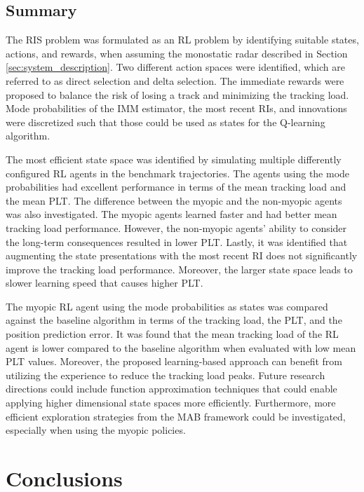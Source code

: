 \documentclass[english, 12pt, a4paper, elec, utf8, a-1b, online]{aaltothesis}
\numberwithin{equation}{section}
\begin{document}
\subsection{Summary}

The RIS problem was formulated as an RL problem by identifying suitable states, actions, and rewards, when assuming the monostatic radar described in Section \ref{sec:system_description}.
Two different action spaces were identified, which are referred to as direct selection and delta selection.
The immediate rewards were proposed to balance the risk of losing a track and minimizing the tracking load.
Mode probabilities of the IMM estimator, the most recent RIs, and innovations were discretized such that those could be used as states for the Q-learning algorithm.

The most efficient state space was identified by simulating multiple differently configured  RL agents in the benchmark trajectories.
The agents using the mode probabilities had excellent performance in terms of the mean tracking load and the mean PLT.
The difference between the myopic and the non-myopic agents was also investigated.
The myopic agents learned faster and had better mean tracking load performance.
However, the non-myopic agents' ability to consider the long-term consequences resulted in lower PLT. 
Lastly, it was identified that augmenting the state presentations with the most recent RI does not significantly improve the tracking load performance.
Moreover, the larger state space leads to slower learning speed that causes higher PLT.  

The myopic RL agent using the mode probabilities as states was compared against the baseline algorithm in terms of the tracking load, the PLT, and the position prediction error.
It was found that the mean tracking load of the RL agent is lower compared to the baseline algorithm when evaluated with low mean PLT values.
Moreover, the proposed learning-based approach can benefit from utilizing the experience to reduce the tracking load peaks.
Future research directions could include function approximation techniques that could enable applying higher dimensional state spaces more efficiently. 
Furthermore, more efficient exploration strategies from the MAB framework could be investigated, especially when using the myopic policies.


\clearpage
\section{Conclusions} \label{sec:conclusions}
\end{document}
